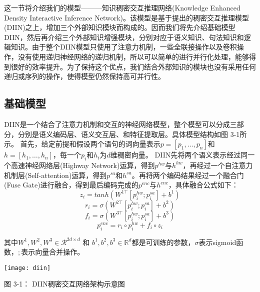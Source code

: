 \documentclass[UTF8,11pt,a4paper,nofonts]{ctexart}
\numberwithin{equation}{section}
\begin{document}
这一节将介绍我们的模型———知识稠密交互推理网络(Knowledge Enhanced Density Interactive Inference Network)。该模型是基于\cite{yichen2018nli}提出的稠密交互推理模型(DIIN)之上，增加三个外部知识模块而构成的。因而我们将先介绍基础模型DIIN，然后再介绍三个外部知识增强模块，分别对应于语义知识、句法知识和逻辑知识。由于整个DIIN模型只使用了注意力机制，一些全联接操作以及卷积操作，没有使用递归神经网络的递归机制，所以可以简单的进行并行化处理，能够得到很好的效率提升。为了保持这个优点，我们结合外部知识的模块也没有采用任何递归或序列的操作，使得模型仍然保持高可并行性。

\subsection{基础模型}

DIIN是一个结合了注意力机制和交互的神经网络模型，整个模型可以分成三部分，分别是语义编码层、语义交互层、和特征提取层。具体模型结构如图 3-1所示。
首先，给定前提和假设两个语句的词向量表示$p=[p_1,\dots,p_n]$和$h=[h_1, \dots, h_n]$，每一个$p_i$和$h_i$为$d$维稠密向量。
DIIN先将两个语义表示经过同一个高速神经网络层(Highway Network)运算，得到$p^{hw}$与$h^{hw}$，再经过一个自注意力机制层(Self-attention)运算，得到$p^{sa}$和$h^{sa}$。再将两个编码结果经过一个融合门(Fuse Gate)进行融合，得到最后编码完成的$p^{enc}$与$h^{enc}$，具体融合公式如下：
\begin{equation}
z_i = tanh(W^{1\top}[p^{hw}_i;p^{sa}_i]+b^1)
\end{equation}
\begin{equation}
r_i = \sigma(W^{2\top}[p^{hw}_i;p^{sa}_i]+b^2)
\end{equation}
\begin{equation}
f_i = \sigma(W^{3\top}[p^{hw}_i;p^{sa}_i]+b^3)
\end{equation}
\begin{equation}
p^{enc}_i = r_i \circ p^{hw}_i + f_i \circ z_i
\end{equation}

其中$W^1, W^2, W^3 \in \mathcal{R}^{2d\times d}$ 和 $b^1, b^2, b^3 \in \mathbb{R}^d$都是可训练的参数，$\sigma$表示sigmoid函数，$;$表示向量合并操作。

\begin{table}[htbp!]
\centering
\texttt{[image: diin]}
\caption*{图 3-1： DIIN稠密交互网络架构示意图}%
\end{table}
\end{document}

